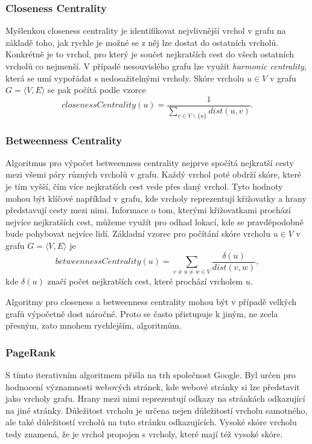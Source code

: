 \documentclass[
  program=infoi,
  biblatex=true,
  figures=true,
  glossaries=false,
  index,
  sourcecodes=true
]{kidiplom}
\begin{document}
\subsubsection{Closeness Centrality}
Myšlenkou closeness centrality je identifikovat nejvlivnější vrchol v grafu na základě toho, jak rychle je možné se z něj lze dostat do ostatních vrcholů. Konkrétně je to vrchol, pro který je součet nejkratších cest do všech ostatních vrcholů co nejmenší. V případě nesouvislého grafu lze využít \textit{harmonic centrality}, která se umí vypořádat s nedosažitelnými vrcholy. Skóre vrcholu $ u \in V $ v grafu $G = \langle V,E\rangle$ se pak počítá podle vzorce
\begin{equation*}
closenessCentrality(u) = \frac{1}{ \sum_{ v \in V \smallsetminus \{ u \} }{ dist(u,v) } }.
\end{equation*}

\subsubsection{Betweenness Centrality}
Algoritmus pro výpočet betweenness centrality\cite{betweenness-original} nejprve spočítá nejkratší cesty mezi všemi páry různých vrcholů v grafu. Každý vrchol poté obdrží skóre, které je tím vyšší, čím více nejkratších cest vede přes daný vrchol. Tyto hodnoty mohou být klíčové například v grafu, kde vrcholy reprezentují křižovatky a hrany představují cesty mezi nimi. Informace o tom, kterými křižovatkami prochází nejvíce nejkratších cest, můžeme využít pro odhad lokací, kde se pravděpodobně bude pohybovat nejvíce lidí. Základní vzorec pro počítání skóre vrcholu $ u \in V $ v grafu $G = \langle V,E\rangle$ je
\begin{equation*}
betweennessCentrality(u) = \sum_{ v \neq u \neq w \in V } \frac{\delta(u)}{ { dist(v,w) } },
\end{equation*}
kde $\delta(u)$ značí počet nejkratších cest, které prochází vrcholem $u$.

Algoritmy pro closeness a betweenness centrality mohou být v případě velkých grafů výpočetně dost náročné. Proto se často přistupuje k jiným, ne zcela přesným, zato mnohem rychlejším, algoritmům.

\subsubsection{PageRank}
S tímto iterativním algoritmem\cite{pagerank-original} přišla na trh společnost Google. Byl určen pro hodnocení významnosti webových stránek, kde webové stránky si lze představit jako vrcholy grafu. Hrany mezi nimi reprezentují odkazy na stránkách odkazující na jiné stránky. Důležitost vrcholu je určena nejen důležitostí vrcholu samotného, ale také důležitostí vrcholů na tuto stránku odkazujících. Vysoké skóre vrcholu tedy znamená, že je vrchol propojen s vrcholy, které mají též vysoké skóre.
\end{document}
